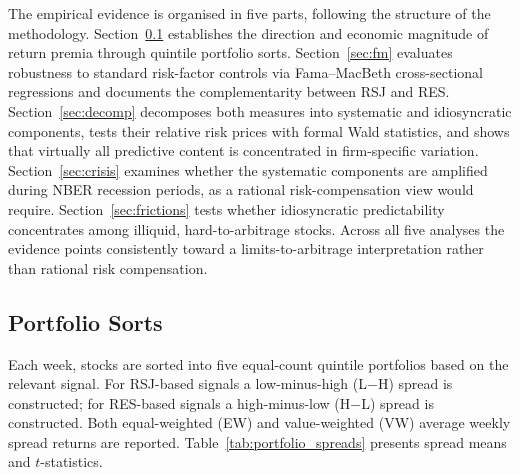 \documentclass[11pt,a4paper]{article}
\begin{document}
The empirical evidence is organised in five parts, following the structure of the
methodology. Section~\ref{sec:portfolio_sorts} establishes the direction and economic
magnitude of return premia through quintile portfolio sorts. Section~\ref{sec:fm}
evaluates robustness to standard risk-factor controls via Fama--MacBeth cross-sectional
regressions and documents the complementarity between RSJ and RES. Section~\ref{sec:decomp}
decomposes both measures into systematic and idiosyncratic components, tests their
relative risk prices with formal Wald statistics, and shows that virtually all predictive
content is concentrated in firm-specific variation. Section~\ref{sec:crisis} examines
whether the systematic components are amplified during NBER recession periods, as a
rational risk-compensation view would require. Section~\ref{sec:frictions} tests whether
idiosyncratic predictability concentrates among illiquid, hard-to-arbitrage stocks.
Across all five analyses the evidence points consistently toward a limits-to-arbitrage
interpretation rather than rational risk compensation.

\subsection{Portfolio Sorts}
\label{sec:portfolio_sorts}

Each week, stocks are sorted into five equal-count quintile portfolios based on the
relevant signal. For RSJ-based signals a low-minus-high (L$-$H) spread is constructed;
for RES-based signals a high-minus-low (H$-$L) spread is constructed. Both equal-weighted
(EW) and value-weighted (VW) average weekly spread returns are reported. Table~\ref{tab:portfolio_spreads}
presents spread means and $t$-statistics.
\end{document}
